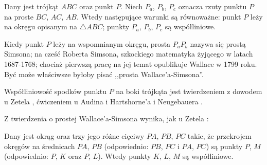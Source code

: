 

\begin{proposition}
	Dany jest trójkąt $ABC$ oraz punkt $P$.
	Niech $P_a$, $P_b$, $P_c$ oznacza rzuty punktu $P$ na proste $BC$, $AC$, $AB$.
	Wtedy następujące warunki są równoważne: punkt $P$ leży na okręgu opisanym na $\triangle ABC$; punkty $P_a$, $P_b$, $P_c$ są współliniowe.
\end{proposition}

Kiedy punkt $P$ leży na wspomnianym okręgu, prosta $P_aP_b$ nazywa się prostą Simsona; na cześć Roberta Simsona, szkockiego matematyka żyjącego w latach 1687-1768; chociaż pierwszą pracę na jej temat opublikuje Wallace w 1799 roku.
Być może właściwsze byłoby pisać ,,prosta Wallace'a-Simsona''.

Współliniowość spodków punktu $P$ na boki trójkąta jest twierdzeniem z dowodem u Zetela \cite[s. 55]{zetel_2020}, ćwiczeniem u Audina \cite[s. 104]{audin_2003} i Hartshorne'a \cite[s. 61]{hartshorne2000} i Neugebauera \cite[s. 25]{neugebauer_2018}.


Z twierdzenia o prostej Wallace'a-Simsona wynika, jak u Zetela \cite[s. 57]{zetel_2020}:

\begin{proposition}
	Dany jest okrąg oraz trzy jego różne cięciwy $PA$, $PB$, $PC$ takie, że przekrojem okręgów na średnicach $PA$, $PB$ (odpowiednio: $PB$, $PC$ i $PA$, $PC$) są punkty $P$, $M$ (odpowiednio: $P$, $K$ oraz $P$, $L$).
	Wtedy punkty $K$, $L$, $M$ są współliniowe.
\end{proposition}

